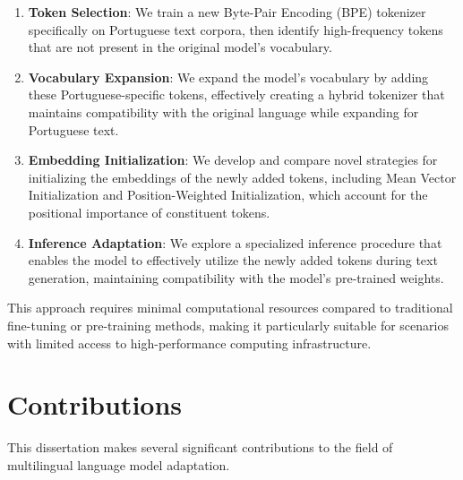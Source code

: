 \begin{enumerate}
    \item \textbf{Token Selection}: We train a new Byte-Pair Encoding (BPE) tokenizer specifically on Portuguese text corpora, then identify high-frequency tokens that are not present in the original model's vocabulary.
    
    \item \textbf{Vocabulary Expansion}: We expand the model's vocabulary by adding these Portuguese-specific tokens, effectively creating a hybrid tokenizer that maintains compatibility with the original language while expanding for Portuguese text.
    
    \item \textbf{Embedding Initialization}: We develop and compare novel strategies for initializing the embeddings of the newly added tokens, including Mean Vector Initialization and Position-Weighted Initialization, which account for the positional importance of constituent tokens.
    
    \item \textbf{Inference Adaptation}: We explore a specialized inference procedure that enables the model to effectively utilize the newly added tokens during text generation, maintaining compatibility with the model's pre-trained weights.
\end{enumerate}

This approach requires minimal computational resources compared to traditional fine-tuning or pre-training methods, making it particularly suitable for scenarios with limited access to high-performance computing infrastructure.

\section{Contributions}\label{Section1.4}
This dissertation makes several significant contributions to the field of multilingual language model adaptation.

